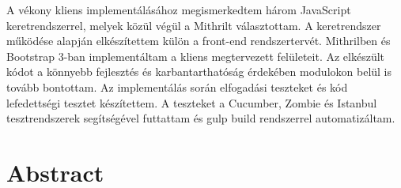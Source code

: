 A vékony kliens implementálásához megismerkedtem három JavaScript keretrendszerrel, melyek közül végül a Mithrilt választottam. A keretrendszer működése alapján elkészítettem külön a front-end rendszertervét. Mithrilben és Bootstrap 3-ban implementáltam a kliens megtervezett felületeit. Az elkészült kódot a könnyebb fejlesztés és karbantarthatóság érdekében modulokon belül is tovább bontottam. Az implementálás során elfogadási teszteket és kód lefedettségi tesztet készítettem. A teszteket a Cucumber, Zombie és Istanbul tesztrendszerek segítségével futtattam és gulp build rendszerrel automatizáltam.



\vfill
{}
\englishParagraph


\chapter*{Abstract}



\vfill
\dolgozatnyelve
{}

\setcounter{romanPage}{\value{page}}

